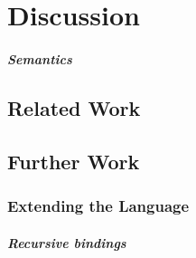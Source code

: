 \chapter{Discussion}
\label{ch:discussion}
  \paragraph{Semantics}

\section{Related Work}
\label{sec:related-work}

\section{Further Work}
\label{sec:further-work}
\subsection{Extending the Language}
  \paragraph{Recursive bindings}
